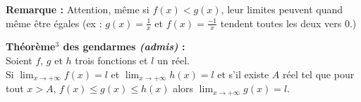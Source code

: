 \documentclass[11pt,a4paper]{article}
\begin{document}
\textbf{Remarque :} Attention, même si $f(x)<g(x)$, leur limites peuvent quand même être égales
(ex : $g(x)=\frac{1}{x}$ et $f(x)=\frac{-1}{x}$ tendent toutes les deux vers $0$.)

\begin{mdframed}[style=proprieteStyle]
    \textbf{Théorème$^3$ des gendarmes \emph{(admis)} :} ~\\
    Soient $f$, $g$ et $h$ trois fonctions et $l$ un réel. \\
    Si $\displaystyle\lim_{x \to +\infty} f(x) = l$ et $\displaystyle\lim_{x \to +\infty} h(x) = l$ et s'il existe $A$
    réel tel que pour tout $x>A$, $f(x)\leq g(x)\leq h(x)$ alors $\displaystyle\lim_{x \to +\infty} g(x) = l$.
\end{mdframed}

\end{document}
